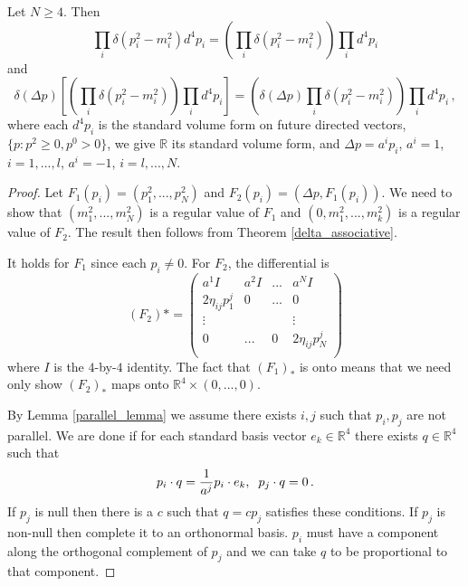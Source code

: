 \begin{lemma}
Let $N\geq 4$. Then
\begin{equation}
\prod_i \delta(p_i^2-m_i^2)d^4p_i=\left(\prod_i \delta(p_i^2-m_i^2)\right)\prod_i d^4p_i
\end{equation}
 and 
\begin{equation}
\delta(\Delta p)\left[\left(\prod_i \delta(p_i^2-m_i^2)\right)\prod_i d^4p_i\right]=\left(\delta(\Delta p)\prod_i \delta(p_i^2-m_i^2)\right)\prod_i d^4p_i\,,
\end{equation}
where each $d^4p_i$ is the standard volume form on future directed vectors, $\{p:p^2\geq 0, p^0>0\}$, we give $\mathbb{R}$ its standard volume form, and $\Delta p=a^ip_i$, $a^i=1$, $i=1,...,l$, $a^i=-1$, $i=l,...,N$. 
\end{lemma}
\begin{proof}
Let $F_1(p_i)=(p_1^2,...,p_N^2)$ and $F_2(p_i)=(\Delta p,F_1(p_i))$.  We need to show that $(m_1^2,...,m_N^2)$ is a regular value of $F_1$ and $(0,m_1^2,...,m_k^2)$ is a regular value of $F_2$.  The result then follows from Theorem \ref{delta_associative}.

It holds for $F_1$ since each $p_i\neq 0$. For $F_2$, the differential is
\begin{equation}
(F_2)*=\left( \begin{array}{cccc}
a^{1}I&a^{2}I&...& a^{N}I \\
2 \eta_{ij}p^j_1&0&...&0\\
\vdots&&&\vdots\\
0&...&0&2 \eta_{ij}p^j_N\\
\end{array} \right)
\end{equation}
where $I$ is the $4$-by-$4$ identity.  The fact that $(F_1)_*$ is onto means that we need only show $(F_2)_*$ maps onto $\mathbb{R}^4\times(0,...,0)$.  

By Lemma \ref{parallel_lemma} we assume there exists $i,j$ such that $p_i,p_j$ are not parallel. We are done if for each standard basis vector $e_k\in\mathbb{R}^4$ there exists $q\in\mathbb{R}^4$ such that
\begin{equation}
p_i\cdot q=\frac{1}{a^j}p_i\cdot e_k,\hspace{2mm} p_j\cdot q=0\,.
\end{equation}
If $p_j$ is null then there is a $c$ such that $q=c p_j$ satisfies these conditions. If $p_j$ is non-null then complete it to an orthonormal basis.  $p_i$ must have a component along the orthogonal complement of $p_j$ and we can take $q$ to be proportional to that component.

\end{proof}



